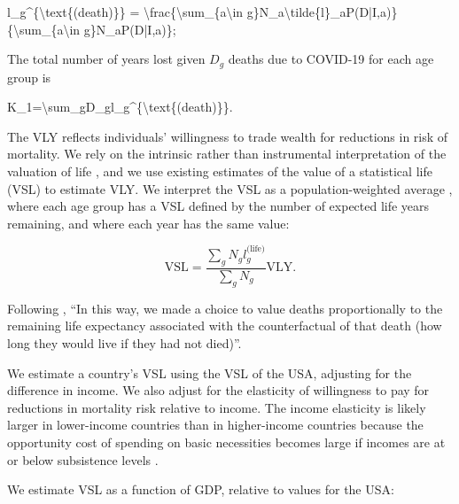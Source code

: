 \documentclass[
]{article}
\newenvironment{Shaded}{\begin{snugshade}}{\end{snugshade}}
\newcommand{\NormalTok}[1]{#1}
\begin{document}
\begin{Shaded}
\begin{Highlighting}[]
\NormalTok{l\_g\^{}\{\textbackslash{}text\{(death)\}\} = \textbackslash{}frac\{\textbackslash{}sum\_\{a\textbackslash{}in g\}N\_a\textbackslash{}tilde\{l\}\_aP(D|I,a)\}\{\textbackslash{}sum\_\{a\textbackslash{}in g\}N\_aP(D|I,a)\}; }
\end{Highlighting}
\end{Shaded}

The total number of years lost given \(D_g\) deaths due to COVID-19 for each age group is

\begin{Shaded}
\begin{Highlighting}[]
\NormalTok{K\_1=\textbackslash{}sum\_gD\_gl\_g\^{}\{\textbackslash{}text\{(death)\}\}.}
\end{Highlighting}
\end{Shaded}

The VLY reflects individuals' willingness to trade wealth for reductions in risk of mortality. We rely on the intrinsic rather than instrumental interpretation of the valuation of life \citep{Cutler2020}, and we use existing estimates of the value of a statistical life (VSL) to estimate VLY. We interpret the VSL as a population-weighted average \citep{Ananthapavan2021, Robinson2021}, where each age group has a VSL defined by the number of expected life years remaining, and where each year has the same value:

\begin{equation}
\text{VSL}=\frac{\sum_gN_gl_g^{\text{(life)}}}{\sum_gN_g}\text{VLY}.
\end{equation}

Following \citet{TheGlobalFund2022}, ``In this way, we made a choice to value deaths proportionally to the remaining life expectancy associated with the counterfactual of that death (how long they would live if they had not died)''.

We estimate a country's VSL using the VSL of the USA, adjusting for the difference in income. We also adjust for the elasticity of willingness to pay for reductions in mortality risk relative to income. The income elasticity is likely larger in lower-income countries than in higher-income countries because the opportunity cost of spending on basic necessities becomes large if incomes are at or below subsistence levels \citep{Hammitt2020}.

We estimate VSL as a function of GDP, relative to values for the USA:
\end{document}
